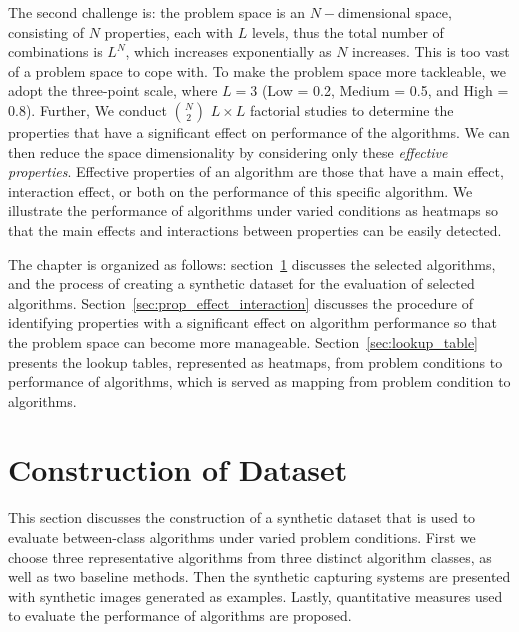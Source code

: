 The second challenge is: the problem space is an $N-$dimensional space, consisting of $N$ properties, each with $L$ levels, thus the total number of combinations is $L^N$, which increases exponentially as $N$ increases. This is too vast of a problem space to cope with. To make the problem space more tackleable, we adopt the three-point scale, where $L=3$ (Low = 0.2, Medium = 0.5, and High = 0.8). Further, We conduct $\binom{N}{2}$ $L\times L$ factorial studies to determine the properties that have a significant effect on performance of the algorithms. We can then reduce the space dimensionality by considering only these \textit{effective properties}. Effective properties of an algorithm are those that have a main effect, interaction effect, or both on the performance of this specific algorithm. We illustrate the performance of algorithms under varied conditions as heatmaps so that the main effects and interactions between properties can be easily detected.

The chapter is organized as follows: section~\ref{sec:create_synth_dataset} discusses the selected algorithms, and the process of creating a synthetic dataset for the evaluation of selected algorithms. Section~\ref{sec:prop_effect_interaction} discusses the procedure of identifying properties with a significant effect on algorithm performance so that the problem space can become more manageable. Section~\ref{sec:lookup_table} presents the lookup tables, represented as heatmaps, from problem conditions to performance of algorithms, which is served as mapping from problem condition to algorithms.

\section{Construction of Dataset}
\label{sec:create_synth_dataset}
This section discusses the construction of a synthetic dataset that is used to evaluate between-class algorithms under varied problem conditions. First we choose three representative algorithms from three distinct algorithm classes, as well as two baseline methods. Then the synthetic capturing systems are presented with  synthetic images generated as examples. Lastly, quantitative measures used to evaluate the performance of algorithms are proposed.

